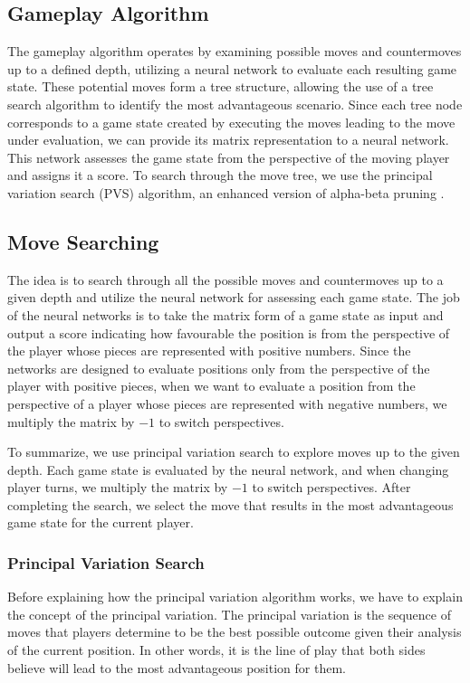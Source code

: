 \documentclass[letterpaper, 12pt]{article}
\begin{document}
\subsection{Gameplay Algorithm}
The gameplay algorithm operates by examining possible moves and countermoves up to a
defined depth, utilizing a neural network to evaluate each resulting game state. These
potential moves form a tree structure, allowing the use of a tree search algorithm to
identify the most advantageous scenario. Since each tree node corresponds to a game
state created by executing the moves leading to the move under evaluation, we can
provide its matrix representation to a neural network. This network assesses the game
state from the perspective of the moving player and assigns it a score. To search
through the move tree, we use the principal variation search (PVS) algorithm, an
enhanced version of alpha-beta pruning \cite{Brud1963}.

\subsection{Move Searching} 
The idea is to search through all the possible moves and countermoves up to a given
depth and utilize the neural network for assessing each game state. The job of the
neural networks is to take the matrix form of a game state as input and output a score
indicating how favourable the position is from the perspective of the player whose
pieces are represented with positive numbers. Since the networks are designed to
evaluate positions only from the perspective of the player with positive pieces, when we
want to evaluate a position from the perspective of a player whose pieces are
represented with negative numbers, we multiply the matrix by \(-1\) to switch
perspectives. 

To summarize, we use principal variation search to explore moves up to the given depth.
Each game state is evaluated by the neural network, and when changing player turns, we
multiply the matrix by \(-1\) to switch perspectives. After completing the search, we
select the move that results in the most advantageous game state for the current player.

\subsubsection{Principal Variation Search}
Before explaining how the principal variation algorithm works, we have to explain the
concept of the principal variation. The principal variation is the sequence of moves
that players determine to be the best possible outcome given their analysis of the
current position. In other words, it is the line of play that both sides believe will
lead to the most advantageous position for them.
\end{document}
